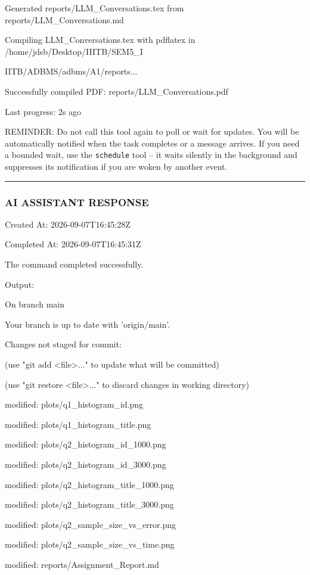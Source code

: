 \documentclass[11pt,a4paper]{article}
\begin{document}
Generated reports/LLM\_Conversations.tex from reports/LLM\_Conversations.md

Compiling LLM\_Conversations.tex with pdflatex in /home/jdsb/Desktop/IIITB/SEM5\_I

IITB/ADBMS/adbms/A1/reports...

Successfully compiled PDF: reports/LLM\_Conversations.pdf


Last progress: 2s ago



REMINDER: Do not call this tool again to poll or wait for updates. You will be automatically notified when the task completes or a message arrives. If you need a bounded wait, use the \texttt{schedule} tool -- it waits silently in the background and suppresses its notification if you are woken by another event.


\hrule

\subsubsection{AI ASSISTANT RESPONSE}

Created At: 2026-09-07T16:45:28Z

Completed At: 2026-09-07T16:45:31Z


The command completed successfully.

Output:

On branch main

Your branch is up to date with 'origin/main'.


Changes not staged for commit:

(use "git add <file>..." to update what will be committed)

(use "git restore <file>..." to discard changes in working directory)

modified:   plots/q1\_histogram\_id.png

modified:   plots/q1\_histogram\_title.png

modified:   plots/q2\_histogram\_id\_1000.png

modified:   plots/q2\_histogram\_id\_3000.png

modified:   plots/q2\_histogram\_title\_1000.png

modified:   plots/q2\_histogram\_title\_3000.png

modified:   plots/q2\_sample\_size\_vs\_error.png

modified:   plots/q2\_sample\_size\_vs\_time.png

modified:   reports/Assignment\_Report.md
\end{document}
